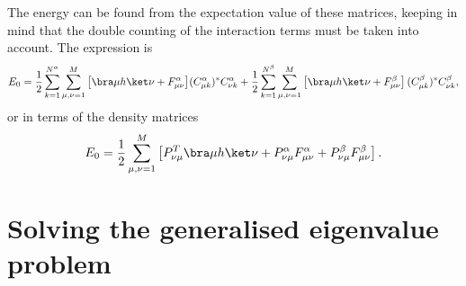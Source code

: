 The energy can be found from the expectation value of these matrices, keeping in mind that the double counting of the interaction terms must be taken into account.
The expression is
\begin{equation}
 E_0 = \frac{1}{2}\sum_{k=1}^{N^\alpha}\sum_{\mu,\nu=1}^M \big[\bra\mu h\ket\nu + F^\alpha_{\mu\nu} \big](C^\alpha_{\mu k})^* C^\alpha_{\nu k}
          +\frac{1}{2}\sum_{k=1}^{N^\beta}\sum_{\mu,\nu=1}^M\left[\bra\mu h\ket\nu + F^\beta_{\mu\nu}\right](C^\beta_{\mu k})^* C^\beta_{\nu k},
\end{equation}
or in terms of the density matrices
\begin{equation}
 E_0 = \frac{1}{2}\sum_{\mu,\nu=1}^M\left[P^T_{\nu\mu}\bra\mu h\ket\nu + P^\alpha_{\nu\mu}F^\alpha_{\mu\nu} + P^\beta_{\nu\mu}F^\beta_{\mu\nu}\right].
\end{equation}




\section{Solving the generalised eigenvalue problem}
\label{sec:gen_eig}

